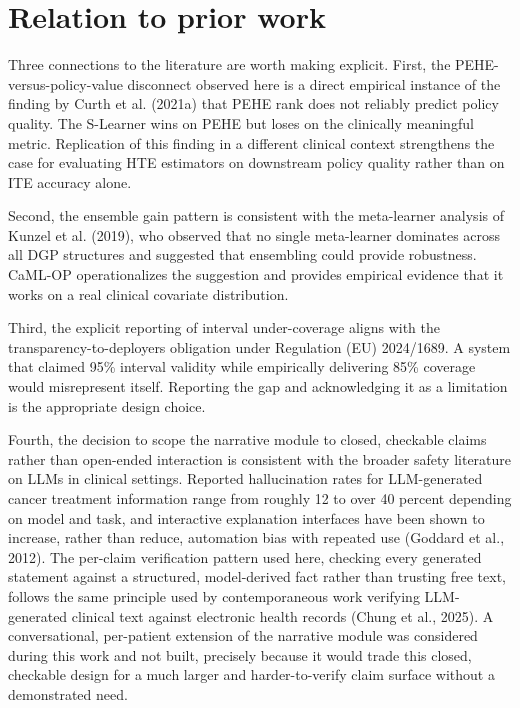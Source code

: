 \section{Relation to prior work}\label{relation-to-prior-work}

Three connections to the literature are worth making explicit. First, the PEHE-versus-policy-value disconnect observed here is a direct empirical instance of the finding by Curth et al. (2021a) that PEHE rank does not reliably predict policy quality. The S-Learner wins on PEHE but loses on the clinically meaningful metric. Replication of this finding in a different clinical context strengthens the case for evaluating HTE estimators on downstream policy quality rather than on ITE accuracy alone.

Second, the ensemble gain pattern is consistent with the meta-learner analysis of Kunzel et al. (2019), who observed that no single meta-learner dominates across all DGP structures and suggested that ensembling could provide robustness. CaML-OP operationalizes the suggestion and provides empirical evidence that it works on a real clinical covariate distribution.

Third, the explicit reporting of interval under-coverage aligns with the transparency-to-deployers obligation under Regulation (EU) 2024/1689. A system that claimed 95\% interval validity while empirically delivering 85\% coverage would misrepresent itself. Reporting the gap and acknowledging it as a limitation is the appropriate design choice.

Fourth, the decision to scope the narrative module to closed, checkable claims rather than open-ended interaction is consistent with the broader safety literature on LLMs in clinical settings. Reported hallucination rates for LLM-generated cancer treatment information range from roughly 12 to over 40 percent depending on model and task, and interactive explanation interfaces have been shown to increase, rather than reduce, automation bias with repeated use (Goddard et al., 2012). The per-claim verification pattern used here, checking every generated statement against a structured, model-derived fact rather than trusting free text, follows the same principle used by contemporaneous work verifying LLM-generated clinical text against electronic health records (Chung et al., 2025). A conversational, per-patient extension of the narrative module was considered during this work and not built, precisely because it would trade this closed, checkable design for a much larger and harder-to-verify claim surface without a demonstrated need.

